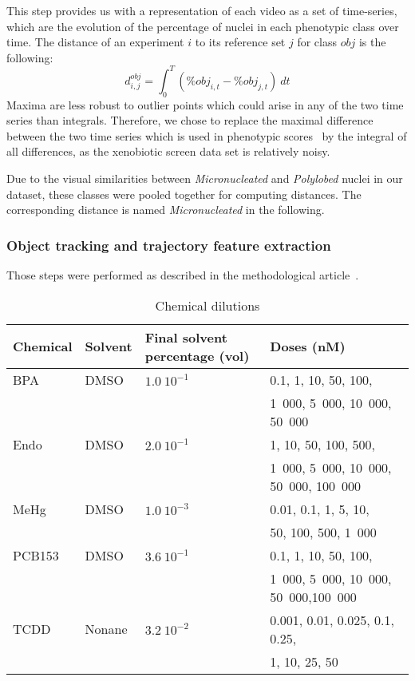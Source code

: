 This step provides us with a representation of each video as a set of time-series, which are the evolution of the percentage of nuclei in each phenotypic class over time. The distance of an experiment $i$ to its reference set $j$ for class $obj$ is the following:
\[
d^{obj}_{i,j} = \int_0^{T} (\% obj_{i,t} - \% obj_{j,t} )~dt
\]
Maxima are less robust to outlier points which could arise in any of
the two time series than integrals. Therefore, we chose to replace the
maximal difference between the two time series which is used in
phenotypic scores~\cite{Walter2010} by the integral of all
differences, as the xenobiotic screen data set is relatively noisy. 

Due to the visual similarities between \textit{Micronucleated} and \textit{Polylobed} nuclei in our dataset, these classes were pooled together for computing distances. The corresponding distance is named \textit{Micronucleated} in the following.

\subsubsection{Object tracking and trajectory feature extraction} Those steps were performed as described in the methodological article~\cite{motiw}.


\begin{table}[!ht]
\caption{Chemical dilutions}
\vspace{0.4cm}
\label{dilutions}
\begin{tabular}{|l|l|l|l|}
\hline
Chemical & Solvent & \parbox{3cm}{Final solvent percentage (vol)} & Doses (nM) \\
\hline
BPA & DMSO & $1.0~10^{-1} $ &0.1, 1, 10, 50, 100, \\
&&&1~000, 5~000, 10~000, 50~000\\
\hline
Endo & DMSO & $2.0~10^{-1} $ &1, 10, 50, 100, 500,\\
&&& 1~000, 5~000, 10~000, 50~000, 100~000\\
\hline
MeHg & DMSO & $1.0~10^{-3} $ & 0.01, 0.1, 1, 5, 10,\\
&&& 50, 100, 500, 1~000\\
\hline
PCB153 & DMSO & $3.6~10^{-1} $ &0.1, 1, 10, 50, 100,\\
&&& 1~000, 5~000, 10~000, 50~000,100~000\\
\hline
TCDD & Nonane &$3.2~10^{-2} $ & 0.001, 0.01,	0.025, 0.1, 0.25,\\
&&& 1, 10, 25, 50\\
\hline
\end{tabular}
\end{table}

